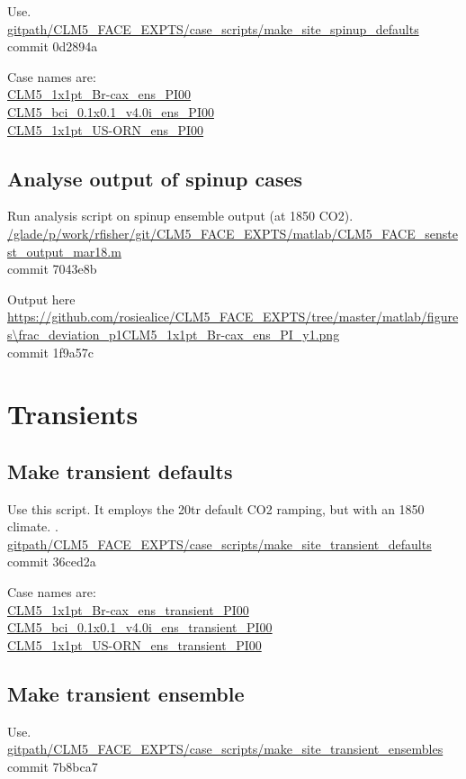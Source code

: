 \documentclass{article}
\begin{document}
Use.\\
{\color{blue}\small{\url{gitpath/CLM5_FACE_EXPTS/case_scripts/make_site_spinup_defaults}}}\\
commit 0d2894a

Case names are:\\
{\color{cyan}\small{\url{CLM5_1x1pt_Br-cax_ens_PI00}}}\\
{\color{cyan}\small{\url{CLM5_bci_0.1x0.1_v4.0i_ens_PI00}}}\\
{\color{cyan}\small{\url{CLM5_1x1pt_US-ORN_ens_PI00}}}

\subsection{Analyse output of spinup cases}

Run analysis script on spinup ensemble output (at 1850 CO2). \\
{\color{blue}\small{\url{/glade/p/work/rfisher/git/CLM5_FACE_EXPTS/matlab/CLM5_FACE_senstest_output_mar18.m}}}\\
commit 7043e8b  

Output here\\
{\color{magenta}\small{\url{https://github.com/rosiealice/CLM5_FACE_EXPTS/tree/master/matlab/figures\frac_deviation_p1CLM5_1x1pt_Br-cax_ens_PI_y1.png}}}\\
commit 1f9a57c  

\section{Transients}

\subsection{Make transient defaults}
Use this script. It employs the 20tr default CO2 ramping, but with an 1850 climate. .\\
{\color{blue}\small{\url{gitpath/CLM5_FACE_EXPTS/case_scripts/make_site_transient_defaults}}}\\
commit 36ced2a

Case names are:\\
{\color{cyan}\small{\url{CLM5_1x1pt_Br-cax_ens_transient_PI00}}}\\
{\color{cyan}\small{\url{CLM5_bci_0.1x0.1_v4.0i_ens_transient_PI00}}}\\
{\color{cyan}\small{\url{CLM5_1x1pt_US-ORN_ens_transient_PI00}}}

\subsection{Make transient ensemble}
Use.\\
{\color{blue}\small{\url{gitpath/CLM5_FACE_EXPTS/case_scripts/make_site_transient_ensembles}}}\\
commit 7b8bca7
\end{document}
